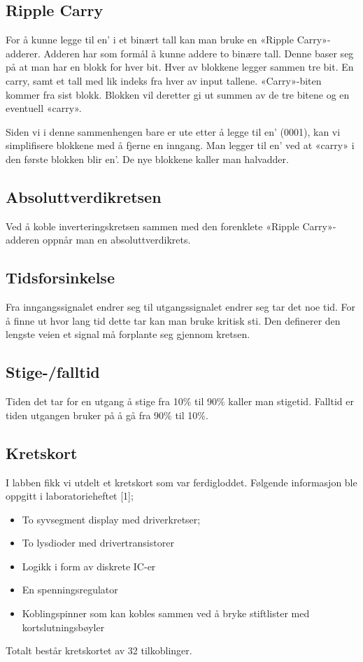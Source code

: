 \documentclass{article}
\begin{document}
\subsection{Ripple Carry}
For å kunne legge til en’ i et binært tall kan man bruke en «Ripple Carry»-adderer. Adderen har som formål å kunne addere to binære tall. Denne baser seg på at man har en blokk for hver bit. Hver av blokkene legger sammen tre bit. En carry, samt et tall med lik indeks fra hver av input tallene. «Carry»-biten kommer fra sist blokk. Blokken vil deretter gi ut summen av de tre bitene og en eventuell «carry».

Siden vi i denne sammenhengen bare er ute etter å legge til en’ (0001), kan vi simplifisere blokkene med å fjerne en inngang. Man legger til en’ ved at «carry» i den første blokken blir en’. De nye blokkene kaller man halvadder.

\subsection{Absoluttverdikretsen}
Ved å koble inverteringskretsen sammen med den forenklete «Ripple Carry»-adderen oppnår man en absoluttverdikrets.

\subsection{Tidsforsinkelse}
Fra inngangssignalet endrer seg til utgangssignalet endrer seg tar det noe tid. For å finne ut hvor lang tid dette tar kan man bruke kritisk sti. Den definerer den lengste veien et signal må forplante seg gjennom kretsen.

\subsection{Stige-/falltid}
Tiden det tar for en utgang å stige fra 10\% til 90\% kaller man stigetid. Falltid er tiden utgangen bruker på å gå fra 90\% til 10\%.

\subsection{Kretskort}
I labben fikk vi utdelt et kretskort som var ferdigloddet. Følgende informasjon ble oppgitt i laboratorieheftet [1];
\begin{itemize}
	\item To syvsegment display med driverkretser;
	\item To lysdioder med drivertransistorer
	\item Logikk i form av diskrete IC-er
	\item En spenningsregulator
	\item Koblingspinner som kan kobles sammen ved å bryke stiftlister med kortslutningsbøyler
\end{itemize}
Totalt består kretskortet av 32 tilkoblinger.
\end{document}
